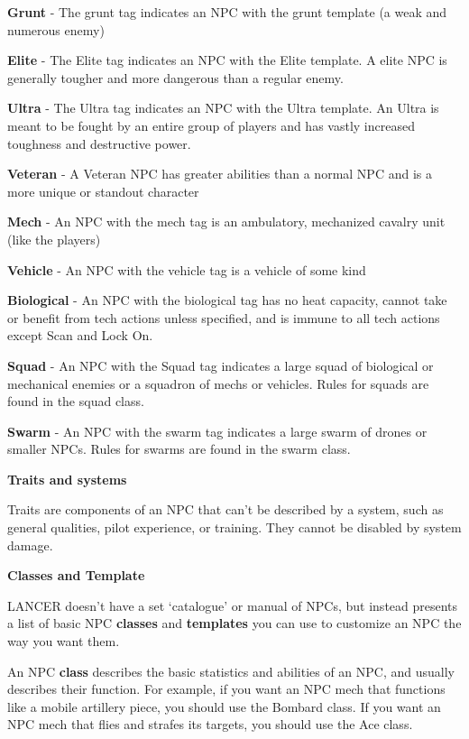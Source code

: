 \textbf{Grunt} - The grunt tag indicates an NPC with the grunt template (a weak and numerous enemy)

\textbf{Elite} - The Elite tag indicates an NPC with the Elite template. A elite NPC is generally tougher
and more dangerous than a regular enemy.

\textbf{Ultra} - The Ultra tag indicates an NPC with the Ultra template. An Ultra is meant to be fought by
an entire group of players and has vastly increased toughness and destructive power.

\textbf{Veteran} - A Veteran NPC has greater abilities than a normal NPC and is a more unique or
standout character

\textbf{Mech} - An NPC with the mech tag is an ambulatory, mechanized cavalry unit (like the players)

\textbf{Vehicle} - An NPC with the vehicle tag is a vehicle of some kind

\textbf{Biological} - An NPC with the biological tag has no heat capacity, cannot take or benefit from
tech actions unless specified, and is immune to all tech actions except Scan and Lock On.

\textbf{Squad} - An NPC with the Squad tag indicates a large squad of biological or mechanical enemies
or a squadron of mechs or vehicles. Rules for squads are found in the squad class.

\textbf{Swarm} - An NPC with the swarm tag indicates a large swarm of drones or smaller NPCs. Rules
for swarms are found in the swarm class.
                          
\begin{center}
    \textbf{Traits and systems}
\end{center}                 

Traits are components of an NPC that can’t be described by a system, such as general qualities,
pilot experience, or training. They cannot be disabled by system damage.
                  
\begin{center}
    \textbf{Classes and Template}
\end{center}

LANCER doesn’t have a set ‘catalogue’ or manual of NPCs, but instead presents a list of basic
NPC \textbf{classes} and \textbf{templates} you can use to customize an NPC the way you want them.

An NPC \textbf{class} describes the basic statistics and abilities of an NPC, and usually describes their
function. For example, if you want an NPC mech that functions like a mobile artillery piece, you
should use the Bombard class. If you want an NPC mech that flies and strafes its targets, you
should use the Ace class.


